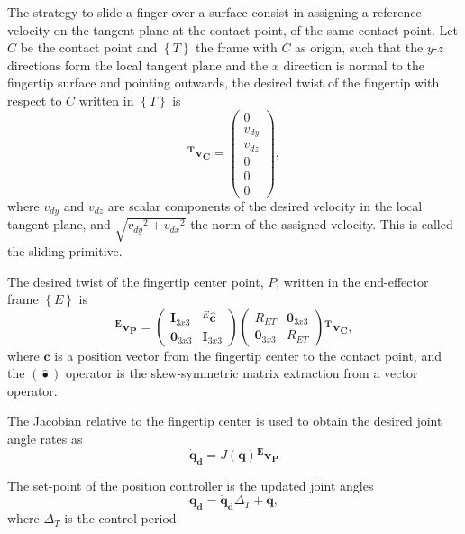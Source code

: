 The strategy to slide a finger over a surface consist in assigning a reference velocity on the tangent plane at the contact point, of the same contact point. Let $C$ be the contact point and $\left\lbrace T \right\rbrace$ the frame with $C$ as origin, such that the $y$-$z$ directions form the local tangent plane and the $x$ direction is normal to the fingertip surface and pointing outwards, the desired twist of the fingertip with respect to $C$ written in $\left\lbrace T \right\rbrace$ is
\begin{equation}
    \bm{^Tv_C}=\left(
    \begin{matrix}
        0\\
        v_{dy}\\
        v_{dz}\\
        0\\
        0\\
        0
    \end{matrix}\right),
\end{equation}
where $v_{dy}$ and $v_{dz}$ are scalar components of the desired velocity in the local tangent plane, and $\sqrt{{v_{dy}}^2+{v_{dx}}^2}$ the norm of the assigned velocity. This is called the sliding primitive.

The desired twist of the fingertip center point, $P$, written in the end-effector frame $\left\lbrace E \right\rbrace$ is
\begin{equation}
\bm{^Ev_P}=\left(
    \begin{array}{cc}
       \bm{I}_{3x3} & ^E\hat{\bm{c}} \\
       \bm{0}_{3x3} & \bm{I}_{3x3}
    \end{array}
    \right)
    \left(
    \begin{array}{cc}
        R_{ET} & \bm{0}_{3x3} \\
        \bm{0}_{3x3} & R_{ET}
    \end{array}
    \right)
    \bm{{^Tv_C}},
\end{equation}
where $\bm{c}$ is a position vector from the fingertip center to the contact point, and the $\left(\hat{•}\right)$ operator is the skew-symmetric matrix extraction from a vector operator.

The Jacobian relative to the fingertip center is used to obtain the desired joint angle rates as
\begin{equation}
    \bm{\dot{q}_d}=J(\bm{q})\bm{^Ev_P}
\end{equation}

The set-point of the position controller is the updated joint angles
\begin{equation}
    \bm{q_d}=\bm{\dot{q}_d}\Delta_T+\bm{q},
\label{anglejointsreference}
\end{equation}
where $\Delta_T$ is the control period.

